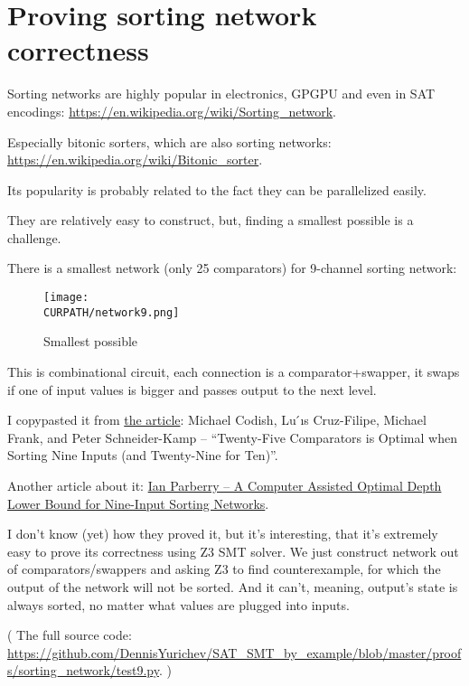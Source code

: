 \section{Proving sorting network correctness}

\renewcommand{\CURPATH}{proofs/sorting_network}

Sorting networks are highly popular in electronics, GPGPU and even in SAT encodings:
\url{https://en.wikipedia.org/wiki/Sorting_network}.

Especially bitonic sorters, which are also sorting networks:
\url{https://en.wikipedia.org/wiki/Bitonic_sorter}.

Its popularity is probably related to the fact they can be parallelized easily.

They are relatively easy to construct, but, finding a smallest possible is a challenge.

There is a smallest network (only 25 comparators) for 9-channel sorting network:

\begin{figure}[H]
\centering
\texttt{[image: \\CURPATH/network9.png]}
\caption{Smallest possible}
\end{figure}

This is combinational circuit, each connection is a comparator+swapper, it swaps if one of input values is bigger and passes output to the next level.

I copypasted it from \href{https://arxiv.org/pdf/1405.5754.pdf}{the article}:
Michael Codish, Lu ́ıs Cruz-Filipe, Michael Frank, and Peter Schneider-Kamp --
``Twenty-Five Comparators is Optimal when Sorting Nine Inputs (and Twenty-Nine for Ten)''.

Another article about it: \href{http://larc.unt.edu/ian/pubs/9-input.pdf}{Ian Parberry -- A Computer Assisted Optimal Depth Lower Bound for Nine-Input Sorting Networks}.

I don't know (yet) how they proved it, but it's interesting, that it's extremely easy to prove its correctness using Z3 SMT solver.
We just construct network out of comparators/swappers and asking Z3 to find counterexample, for which the output of the network will not be sorted.
And it can't, meaning, output's state is always sorted, no matter what values are plugged into inputs.



( The full source code: \url{https://github.com/DennisYurichev/SAT_SMT_by_example/blob/master/proofs/sorting_network/test9.py}. )

